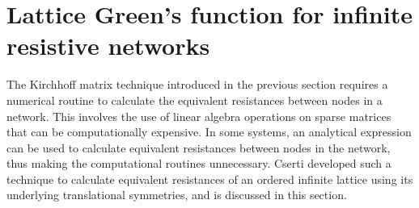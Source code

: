 \section{Lattice Green's function for infinite resistive networks}
\label{sec: Green's Function}
The Kirchhoff matrix technique introduced in the previous section requires a numerical routine to calculate the equivalent resistances between nodes in a network. This involves the use of linear algebra operations on sparse matrices that can be computationally expensive. In some systems, an analytical expression can be used to calculate equivalent resistances between nodes in the network, thus making the computational routines unnecessary. Cserti developed such a technique to calculate equivalent resistances of an ordered infinite lattice using its underlying translational symmetries\cite{cserti2000}, and is discussed in this section.  

